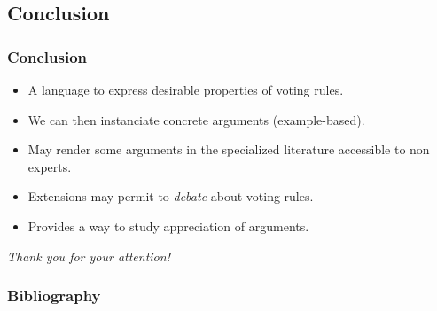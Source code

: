 \documentclass[english]{beamer}
\begin{document}
\subsection{Conclusion}
\begin{frame}
	\frametitle{Conclusion}
	
	\begin{itemize}
		\item A language to express desirable properties of voting rules.
		\item We can then instanciate concrete arguments (example-based).
		\item May render some arguments in the specialized literature accessible to non experts.
		\item Extensions may permit to \emph{debate} about voting rules.
		\item Provides a way to study appreciation of arguments.
	\end{itemize}
\end{frame}

\begin{frame}[plain]
	\addtocounter{framenumber}{-1}
	\begin{center}
		\huge
		\textit{Thank you for your attention!}
	\end{center}
\end{frame}

\appendix
\AtBeginSection{
}

\begin{frame}[allowframebreaks]
	\frametitle{Bibliography}
	\def\newblock{\hskip .11em plus .33em minus .07em}
 	
\end{frame}
\end{document}
